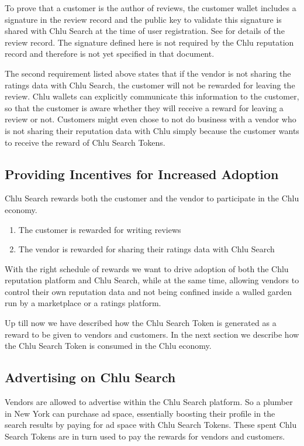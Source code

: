 \documentclass[a4paper]{article}
\begin{document}
To prove that a customer is the author of reviews, the customer wallet
includes a signature in the review record and the public key to
validate this signature is shared with Chlu Search at the time of user
registration. See \cite{chlu-reputation} for details of the review
record. The signature defined here is not required by the Chlu
reputation record and therefore is not yet specified in that document.

The second requirement listed above states that if the vendor is not
sharing the ratings data with Chlu Search, the customer will not be
rewarded for leaving the review. Chlu wallets can explicitly
communicate this information to the customer, so that the customer is
aware whether they will receive a reward for leaving a review or
not. Customers might even chose to not do business with a vendor who
is not sharing their reputation data with Chlu simply because the
customer wants to receive the reward of Chlu Search Tokens.

\subsection{Providing Incentives for Increased Adoption}

Chlu Search rewards both the customer and the vendor to participate in
the Chlu economy.

\begin{enumerate}
\item The customer is rewarded for writing reviews
\item The vendor is rewarded for sharing their ratings data with Chlu
  Search
\end{enumerate}

With the right schedule of rewards we want to drive adoption of both
the Chlu reputation platform and Chlu Search, while at the same time,
allowing vendors to control their own reputation data and not being
confined inside a walled garden run by a marketplace or a ratings
platform.

Up till now we have described how the Chlu Search Token is generated
as a reward to be given to vendors and customers. In the next section
we describe how the Chlu Search Token is consumed in the Chlu economy.

\subsection{Advertising on Chlu Search}

Vendors are allowed to advertise within the Chlu Search platform. So a
plumber in New York can purchase ad space, essentially boosting their
profile in the search results by paying for ad space with Chlu Search
Tokens. These spent Chlu Search Tokens are in turn used to pay the
rewards for vendors and customers.
\end{document}
